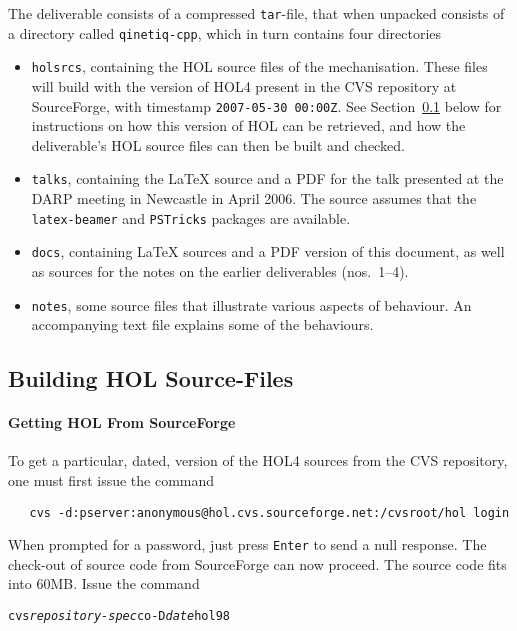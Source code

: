 \documentclass[11pt]{article}
\begin{document}
The deliverable consists of a compressed \texttt{tar}-file, that when
unpacked consists of a directory called \texttt{qinetiq-cpp}, which in
turn contains four directories
\begin{itemize}
\item \texttt{holsrcs}, containing the HOL source files of the
  mechanisation.  These files will build with the version of HOL4
  present in the CVS repository at SourceForge, with timestamp
  \texttt{2007-05-30 00:00Z}.  See Section~\ref{sec:getting-hol}
  below for instructions on how this version of HOL can be retrieved,
  and how the deliverable's HOL source files can then be built and
  checked.
\item \texttt{talks}, containing the \LaTeX{} source and a PDF for the
  talk presented at the DARP meeting in Newcastle in April 2006.  The
  source assumes that the \texttt{latex-beamer} and \texttt{PSTricks}
  packages are available.
\item \texttt{docs}, containing \LaTeX{} sources and a PDF version of
  this document, as well as sources for the notes on the earlier
  deliverables (nos.~1--4).
\item \texttt{notes}, some \cpp{} source files that illustrate various
  aspects of \cpp{} behaviour.  An accompanying text file explains some
  of the behaviours.
\end{itemize}

\subsection{Building HOL Source-Files}
\label{sec:getting-hol}

\paragraph{Getting HOL From SourceForge}

To get a particular, dated, version of the HOL4 sources from the CVS
repository, one must first issue the command

{\small
\begin{verbatim}
   cvs -d:pserver:anonymous@hol.cvs.sourceforge.net:/cvsroot/hol login
\end{verbatim}
}

When prompted for a password, just press \texttt{Enter} to send a null
response.  The check-out of source code from SourceForge can now
proceed.  The source code fits into 60MB.  Issue the command

{\small
\begin{alltt}
   cvs \textit{repository-spec} co -D \textit{date} hol98
\end{alltt}
}
\end{document}
